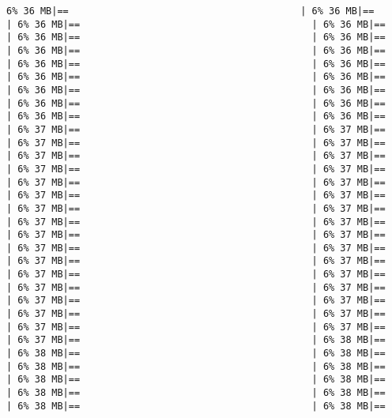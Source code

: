 \documentclass[
]{article}
\begin{document}
\begin{verbatim}
6% 36 MB|==                                         | 6% 36 MB|==                                         | 6% 36 MB|==                                         | 6% 36 MB|==                                         | 6% 36 MB|==                                         | 6% 36 MB|==                                         | 6% 36 MB|==                                         | 6% 36 MB|==                                         | 6% 36 MB|==                                         | 6% 36 MB|==                                         | 6% 36 MB|==                                         | 6% 36 MB|==                                         | 6% 36 MB|==                                         | 6% 36 MB|==                                         | 6% 36 MB|==                                         | 6% 36 MB|==                                         | 6% 36 MB|==                                         | 6% 36 MB|==                                         | 6% 37 MB|==                                         | 6% 37 MB|==                                         | 6% 37 MB|==                                         | 6% 37 MB|==                                         | 6% 37 MB|==                                         | 6% 37 MB|==                                         | 6% 37 MB|==                                         | 6% 37 MB|==                                         | 6% 37 MB|==                                         | 6% 37 MB|==                                         | 6% 37 MB|==                                         | 6% 37 MB|==                                         | 6% 37 MB|==                                         | 6% 37 MB|==                                         | 6% 37 MB|==                                         | 6% 37 MB|==                                         | 6% 37 MB|==                                         | 6% 37 MB|==                                         | 6% 37 MB|==                                         | 6% 37 MB|==                                         | 6% 37 MB|==                                         | 6% 37 MB|==                                         | 6% 37 MB|==                                         | 6% 37 MB|==                                         | 6% 37 MB|==                                         | 6% 37 MB|==                                         | 6% 37 MB|==                                         | 6% 37 MB|==                                         | 6% 37 MB|==                                         | 6% 37 MB|==                                         | 6% 37 MB|==                                         | 6% 37 MB|==                                         | 6% 37 MB|==                                         | 6% 38 MB|==                                         | 6% 38 MB|==                                         | 6% 38 MB|==                                         | 6% 38 MB|==                                         | 6% 38 MB|==                                         | 6% 38 MB|==                                         | 6% 38 MB|==                                         | 6% 38 MB|==                                         | 6% 38 MB|==                                         | 6% 38 MB|==                                         | 6% 38 MB|==              
\end{verbatim}
\end{document}
